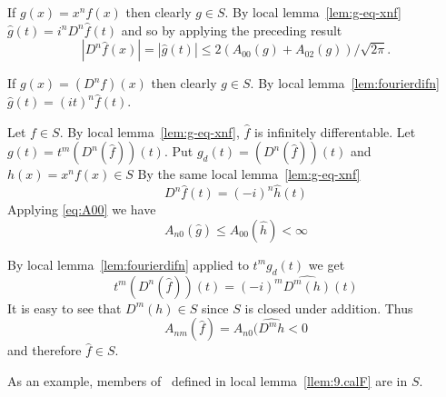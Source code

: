 \begin{enumerate}
If \(g(x) = x^nf(x)\) then clearly \(g\in S\).
By local lemma~\ref{lem:g-eq-xnf}
\(\hat{g}(t) = i^nD^n\hat{f}(t)\) and so by applying the preceding result
\begin{equation*}
|D^n\hat{f}(x)| = |\hat{g}(t)| \leq 2(A_{00}(g) + A_{02}(g)) /\sqrt{2\pi}.
\end{equation*}


If \(g(x) = (D^nf)(x)\) then clearly \(g\in S\).
By local lemma~\ref{lem:fourierdifn}
\(\hat{g}(t) = (it)^n\hat{f}(t)\).

Let \(f\in S\).
By local lemma~\ref{lem:g-eq-xnf}, \(\hat{f}\) is infinitely differentable.
Let \(g(t) = t^m(D^n(\hat{f}))(t)\).
Put \(g_d(t) = (D^n(\hat{f}))(t)\)
and \(h(x) = x^nf(x) \in S\)
By the same local lemma~\ref{lem:g-eq-xnf}
\begin{equation*}
  D^n\hat{f}(t) = (-i)^n\hat{h}(t)
\end{equation*}
Applying \eqref{eq:A00} we have 
\begin{equation*}
A_{n0}(\hat{g}) \leq A_{00}(\hat{h}) < \infty
\end{equation*}

By local lemma~\ref{lem:fourierdifn} applied to \(t^mg_d(t)\) we get
\begin{equation*}
t^m(D^n(\hat{f}))(t) = (-i)^m\widehat{D^m(h)}(t)
\end{equation*}
It is easy to see that \(D^m(h)\in S\) since $S$ is closed under addition.
Thus 
\begin{equation*}
A_{nm}(\hat{f}) = A_{n0}(\widehat{D^mh} < 0
\end{equation*}
and therefore \(\hat{f}\in S\).

\iffalse
If \(f\in C^1(\R)\) and its derivative is bounded then 
for each \(\epsilon>0\) 
we have \(|f(s)-f(t)|<\epsilon\) whenever 
\(|s-t|<\delta=\epsilon / (\|f'\|_\infty+1)\), 
that is $f$ is uniformly continuous.
Hence any member of $S$ is uniformly continuous.

Also if \(f\in S\) and \(m\in\{0,1\}\) then
\begin{equation*}
\int |f| = \int x^2|f|/x^2 \leq A_{02}x^{-2} < \infty
\end{equation*}
and so \(S\subset L^1(\R)\).
Almost directly by definition, if \(f\in S\) and \(g(x) = x^kf(x)\) 
for some \(k\geq 0\)
then \(g\in S\) as well.

Let \(f\in S\), and let \(g(x) = ixf(x)\).
With the above and theorem~9.2\ich{f} \({\hat{f}}' = \hat{g}\).
\fi %

As an example,
members of \calF\ defined in local lemma~\ref{llem:9.calF} are in $S$.



\end{enumerate}

